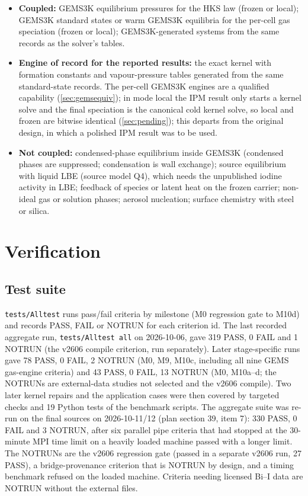 \documentclass[11pt,a4paper]{article}
\begin{document}
\begin{itemize}
\item \textbf{Coupled:} GEMS3K equilibrium pressures for the HKS law
  (frozen or local); GEMS3K standard states or warm GEMS3K equilibria
  for the per-cell gas speciation (frozen or local); GEMS3K-generated
  systems from the same records as the solver's tables.
\item \textbf{Engine of record for the reported results:} the exact
  kernel with formation constants and vapour-pressure tables generated
  from the same standard-state records. The per-cell GEMS3K engines are a
  qualified capability (\cref{sec:gemsequiv}); in mode local the IPM
  result only starts a kernel solve and the final speciation is the
  canonical cold kernel solve, so local and frozen are bitwise identical
  (\cref{sec:pending}); this departs from the original design, in which a
  polished IPM result was to be used.
\item \textbf{Not coupled:} condensed-phase equilibrium inside GEMS3K
  (condensed phases are suppressed; condensation is wall exchange);
  source equilibrium with liquid LBE (source model Q4), which needs the
  unpublished iodine activity in LBE; feedback of species or latent heat
  on the frozen carrier; non-ideal gas or solution phases; aerosol
  nucleation; surface chemistry with steel or silica.
\end{itemize}

\section{Verification}
\label{sec:verification}

\subsection{Test suite}

\texttt{tests/Alltest} runs pass/fail criteria by milestone (M0 regression
gate to M10d) and records PASS, FAIL or NOTRUN for each criterion id. The
last recorded aggregate run, \texttt{tests/Alltest all} on 2026-10-06,
gave 319 PASS, 0 FAIL and 1 NOTRUN (the v2606 compile criterion, run
separately). Later stage-specific runs gave 78 PASS, 0 FAIL, 2 NOTRUN
(M0, M9, M10c, including all nine GEMS gas-engine criteria) and 43 PASS,
0 FAIL, 13 NOTRUN (M0, M10a--d; the NOTRUNs are external-data studies not
selected and the v2606 compile). Two later kernel repairs and the
application cases were then covered by targeted checks and 19 Python
tests of the benchmark scripts. The aggregate suite was re-run on the
final sources on 2026-10-11/12 (plan section 39, item 7): 330 PASS,
0 FAIL and 3 NOTRUN, after six parallel pipe criteria that had stopped
at the 30-minute MPI time limit on a heavily loaded machine passed with
a longer limit. The NOTRUNs are the v2606 regression gate (passed in a
separate v2606 run, 27 PASS), a bridge-provenance criterion that is
NOTRUN by design, and a timing benchmark refused on the loaded machine.
Criteria needing licensed Bi--I data are NOTRUN without the external
files.
\end{document}
